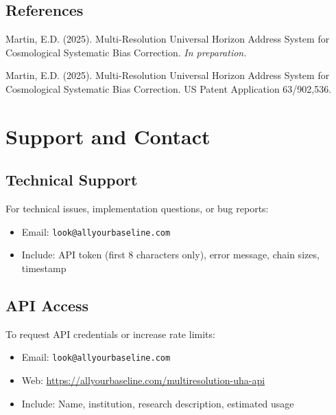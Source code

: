 \documentclass[11pt]{article}
\begin{document}
\subsection{References}

\begin{thebibliography}{99}

Martin, E.D. (2025).
Multi-Resolution Universal Horizon Address System for Cosmological Systematic Bias Correction.
\textit{In preparation.}

Martin, E.D. (2025).
Multi-Resolution Universal Horizon Address System for Cosmological Systematic Bias Correction.
US Patent Application 63/902,536.

\end{thebibliography}

\section{Support and Contact}

\subsection{Technical Support}

For technical issues, implementation questions, or bug reports:

\begin{itemize}
    \item Email: \texttt{look@allyourbaseline.com}
    \item Include: API token (first 8 characters only), error message, chain sizes, timestamp
\end{itemize}

\subsection{API Access}

To request API credentials or increase rate limits:

\begin{itemize}
    \item Email: \texttt{look@allyourbaseline.com}
    \item Web: \url{https://allyourbaseline.com/multiresolution-uha-api}
    \item Include: Name, institution, research description, estimated usage
\end{itemize}
\end{document}
